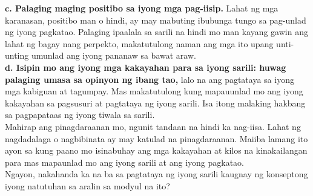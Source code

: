 \documentclass[10pt,a4paper]{article}
\begin{document}
\begin{multicols*}{3}
\textbf{c. Palaging maging positibo sa iyong mga pag-iisip.} Lahat ng mga karanasan, positibo man o hindi, ay may mabuting ibubunga tungo sa pag-unlad ng iyong pagkatao. Palaging ipaalala sa sarili na hindi mo man kayang gawin ang lahat ng bagay nang perpekto, makatutulong naman ang mga ito upang unti-unting umunlad ang iyong pananaw sa bawat araw.\\

\textbf{d. Isipin mo ang iyong mga kakayahan para sa iyong sarili: huwag palaging umasa sa opinyon ng ibang tao,} lalo na ang pagtataya sa iyong mga kabiguan at tagumpay. Mas makatutulong kung mapauunlad mo ang iyong kakayahan sa pagsusuri at pagtataya ng iyong sarili. Isa itong malaking hakbang sa pagpapataas ng iyong tiwala sa sarili.\\

Mahirap ang pinagdaraanan mo, ngunit tandaan na hindi ka nag-iisa. Lahat ng nagdadalaga o nagbibinata ay may katulad na pinagdaraanan. Maiiba lamang ito ayon sa kung paano mo isinabuhay ang mga kakayahan at kilos na kinakailangan para mas mapaunlad mo ang iyong sarili at ang iyong pagkatao.\\

Ngayon, nakahanda ka na ba sa pagtataya ng iyong sarili kaugnay ng konseptong iyong natutuhan sa aralin sa modyul na ito?
\end{multicols*}
\end{document}
